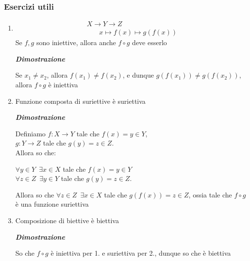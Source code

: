 \documentclass{article}
\theoremstyle{definition}
\begin{document}
\subsubsection{Esercizi utili}
\begin{enumerate}
    \item \begin{align*}
 X \to Y \to Z \\
\,\,\,\,\,\,\,\,\,\,\,x \mapsto f(x) \mapsto g(f(x))
\end{align*}
Se $f,g$ sono iniettive, allora anche $f \circ g$ deve esserlo 
\begin{center}
    \textbf{\textit{Dimostrazione}}
\end{center}
Se $x_1 \neq x_2$, allora $f(x_1) \neq f(x_2)$, e dunque $g(f(x_1)) \neq g(f(x_2))$, allora $f \circ g$ è iniettiva
\item Funzione composta di suriettive è suriettiva 
\begin{center}
    \textbf{\textit{Dimostrazione}}
\end{center}
Definiamo $f:X \to Y$ tale che $f(x) = y \in Y$, \\
$g: Y \to Z$ tale che $g(y)=z \in Z$.
\\
Allora so che:
\begin{center}
    $\forall y \in Y \,\,\, \exists x \in X$ tale che $f(x) = y \in Y$ \\
    $\forall z \in Z \,\,\, \exists y \in Y$ tale che $g(y)=z \in Z$.
\end{center}
Allora so che $\forall z \in Z \,\,\, \exists x \in X$ tale che $g(f(x))=z \in Z$, ossia tale che $f \circ g$ è una funzione suriettiva
\item Composizione di biettive è biettiva
\begin{center}
    \textbf{\textit{Dimostrazione}}
\end{center}
So che $f \circ g$ è iniettiva per 1. e suriettiva per 2., dunque so che è biettiva

\end{enumerate}
\end{document}
